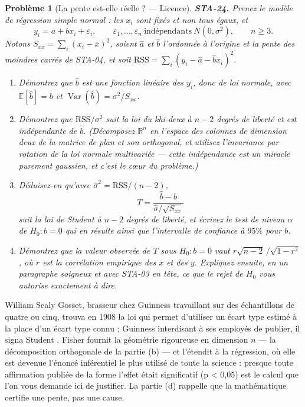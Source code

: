\documentclass[11pt]{article}
\newtheorem{problem}{Problème}
\begin{document}
\begin{problem}[{La pente est-elle réelle ? --- Licence}]
\textbf{STA-24.} Prenez le modèle de régression simple normal : les $ x_i $ sont fixés et non
tous égaux, et
\[ y_i = a + b x_i + \varepsilon_i , \qquad \varepsilon_1, \dots, \varepsilon_n
 \ \text{indépendants} \ N(0, \sigma^2), \qquad n \ge 3 . \]
Notons $ S_{xx} = \sum_i (x_i - \bar{x})^2 $, soient $ \hat{a} $ et $ \hat{b} $ l'ordonnée à
l'origine et la pente des moindres carrés de STA-04, et soit
$ \mathrm{RSS} = \sum_i (y_i - \hat{a} - \hat{b}x_i)^2 $.
\begin{enumerate}
\item[(a)] Démontrez que $ \hat{b} $ est une fonction linéaire des $ y_i $, donc de loi normale, avec
$ \mathbb{E}[\hat{b}] = b $ et $ \operatorname{Var}(\hat{b}) = \sigma^2 / S_{xx} $.
\item[(b)] Démontrez que $ \mathrm{RSS}/\sigma^2 $ suit la loi du khi-deux à $ n-2 $ degrés de liberté
et est indépendante de $ \hat{b} $. (Décomposez $ \mathbb{R}^n $ en l'espace des colonnes de
dimension deux de la matrice de plan et son orthogonal, et utilisez l'invariance par rotation de la
loi normale multivariée --- cette indépendance est un miracle purement gaussien, et c'est le c\oe{}ur du
problème.)
\item[(c)] Déduisez-en qu'avec $ \hat{\sigma}^2 = \mathrm{RSS}/(n-2) $,
\[ T = \frac{\hat{b} - b}{\hat{\sigma}/\sqrt{S_{xx}}} \]
suit la loi de Student à $ n-2 $ degrés de liberté, et écrivez le test de niveau $ \alpha $ de
$ H_0: b = 0 $ qui en résulte ainsi que l'intervalle de confiance à $ 95\% $ pour
$ b $.
\item[(d)] Démontrez que la valeur observée de $ T $ sous $ H_0: b = 0 $ vaut
$ r\sqrt{n-2}\,/\sqrt{1-r^2} $, où $ r $ est la corrélation empirique des $ x $ et des
$ y $. Expliquez ensuite, en un paragraphe soigneux et avec STA-03 en tête, ce que le rejet de
$ H_0 $ vous autorise exactement à dire.
\end{enumerate}

\end{problem}

\noindent William Sealy Gosset, brasseur chez Guinness travaillant sur des échantillons de
quatre ou cinq, trouva en 1908 la loi qui permet d'utiliser un écart type estimé à la place d'un
écart type connu ; Guinness interdisant à ses employés de publier, il signa \og{} Student \fg{}. Fisher
fournit la géométrie rigoureuse en dimension $ n $ --- la décomposition orthogonale de la partie
(b) --- et l'étendit à la régression, où elle est devenue l'énoncé inférentiel le plus utilisé de
toute la science : presque toute affirmation publiée de la forme \og{} l'effet était significatif
(p < 0,05) \fg{} est le calcul que l'on vous demande ici de justifier. La partie (d) rappelle que la
mathématique certifie une pente, pas une cause.
\end{document}

